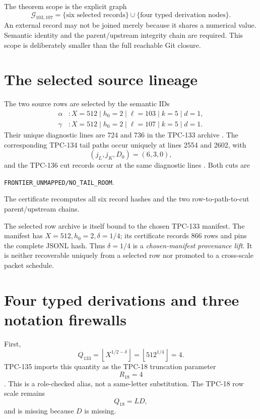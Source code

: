 \documentclass[11pt]{article}
\newcommand{\code}[1]{\nolinkurl{#1}}
\begin{document}
The theorem scope is the explicit graph
\[
 \mathcal G_{103,107}
 =
 \{\text{six selected records}\}
 \cup
 \{\text{four typed derivation nodes}\}.
\]
An external record may not be joined merely because it shares a numerical
value.  Semantic identity and the parent/upstream integrity chain are
required.  This scope is deliberately smaller than the full reachable Git
closure.

\section{The selected source lineage}

The two source rows are selected by the semantic IDs
\[
\begin{split}
 \alpha &: X=512\mid h_0=2\mid \ell=103\mid k=5\mid d=1,\\
 \gamma &: X=512\mid h_0=2\mid \ell=107\mid k=5\mid d=1.
\end{split}
\]
Their unique diagnostic lines are 724 and 736 in the TPC-133 archive
\citep{WangTPC133}.  The corresponding TPC-134 tail paths occur uniquely at
lines 2554 and 2602, with
\[
 (j_L,j_K,D_0)=(6,3,0),
\]
and the TPC-136 cut records occur at the same diagnostic lines
\citep{WangTPC134,WangTPC136}.  Both cuts are
\begin{center}
\code{FRONTIER_UNMAPPED/NO_TAIL_ROOM}.
\end{center}
The certificate recomputes all six record hashes and the two
row-to-path-to-cut parent/upstream chains.

The selected row archive is itself bound to the chosen TPC-133 manifest.
The manifest has \(X=512,h_0=2,\delta=1/4\); its certificate records 866
rows and pins the complete JSONL hash.  Thus \(\delta=1/4\) is a
\emph{chosen-manifest provenance lift}.  It is neither recoverable uniquely
from a selected row nor promoted to a cross-scale packet schedule.

\section{Four typed derivations and three notation firewalls}

First,
\[
 Q_{133}
 =\left\lfloor X^{1/2-\delta}\right\rfloor
 =\left\lfloor512^{1/4}\right\rfloor=4.
\]
TPC-135 imports this quantity as the TPC-18 truncation parameter
\[
 R_{18}=4
\]
\citep{WangTPC18,WangTPC135}.  This is a role-checked alias, not a
same-letter substitution.  The TPC-18 row scale remains
\[
 Q_{18}=LD,
\]
and is missing because \(D\) is missing.
\end{document}
